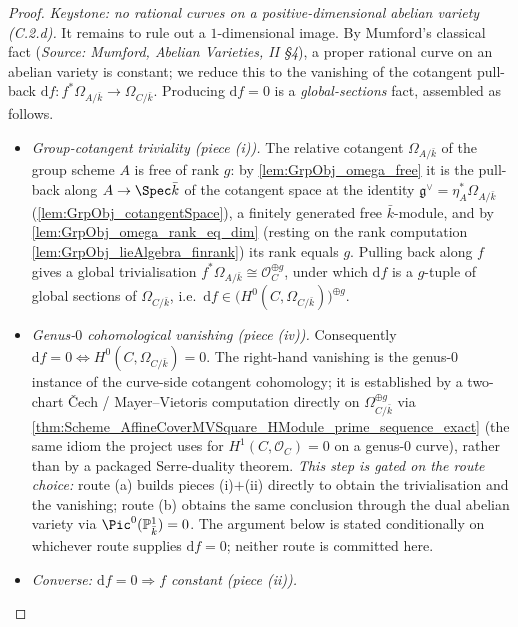 \begin{proof}
  \emph{Keystone: no rational curves on a positive-dimensional abelian variety
  (C.2.d).} It remains to rule out a \(1\)-dimensional image. By Mumford's
  classical fact (\textit{Source: Mumford, Abelian Varieties, II §4}), a proper
  rational curve on an abelian variety is constant; we reduce this to the
  vanishing of the cotangent pull-back
  \(\mathrm df \colon f^{*}\Omega_{A/\bar k} \to \Omega_{C/\bar k}\). Producing
  \(\mathrm df = 0\) is a \emph{global-sections} fact, assembled as follows.
  \begin{itemize}
    \item \emph{Group-cotangent triviality (piece (i)).} The relative cotangent
      \(\Omega_{A/\bar k}\) of the group scheme \(A\) is free of rank \(g\): by
      \cref{lem:GrpObj_omega_free} it is the pull-back along \(A \to \Spec \bar k\)
      of the cotangent space at the identity \(\mathfrak g^{\vee} = \eta_A^{*}\Omega_{A/\bar k}\)
      (\cref{lem:GrpObj_cotangentSpace}), a finitely generated free
      \(\bar k\)-module, and by \cref{lem:GrpObj_omega_rank_eq_dim} (resting on
      the rank computation \cref{lem:GrpObj_lieAlgebra_finrank}) its rank equals
      \(g\). Pulling back along \(f\) gives a global trivialisation
      \(f^{*}\Omega_{A/\bar k} \cong \mathcal O_C^{\oplus g}\), under which
      \(\mathrm df\) is a \(g\)-tuple of global sections of \(\Omega_{C/\bar k}\),
      i.e.\ \(\mathrm df \in \bigl(H^0(C, \Omega_{C/\bar k})\bigr)^{\oplus g}\).
    \item \emph{Genus-\(0\) cohomological vanishing (piece (iv)).} Consequently
      \(\mathrm df = 0 \iff H^0(C, \Omega_{C/\bar k}) = 0\). The right-hand
      vanishing is the genus-\(0\) instance of the curve-side cotangent
      cohomology; it is established by a two-chart \v Cech / Mayer--Vietoris
      computation directly on \(\Omega_{C/\bar k}^{\oplus g}\) via
      \cref{thm:Scheme_AffineCoverMVSquare_HModule_prime_sequence_exact} (the
      same idiom the project uses for \(H^1(C, \mathcal O_C) = 0\) on a genus-\(0\)
      curve), rather than by a packaged Serre-duality theorem. \emph{This step
      is gated on the route choice:} route (a) builds pieces (i)\(+\)(ii)
      directly to obtain the trivialisation and the vanishing; route (b) obtains
      the same conclusion through the dual abelian variety via
      \(\Pic^0(\mathbb P^1_{\bar k}) = 0\). The argument below is stated
      conditionally on whichever route supplies \(\mathrm df = 0\); neither route
      is committed here.
    \item \emph{Converse: \(\mathrm df = 0 \Rightarrow f\) constant (piece (ii)).}

\end{itemize}
\end{proof}
